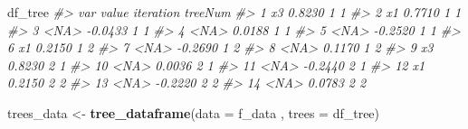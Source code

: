 \documentclass[
]{article}
\newenvironment{Shaded}{\begin{snugshade}}{\end{snugshade}}
\newcommand{\AttributeTok}[1]{\textcolor[rgb]{0.13,0.29,0.53}{#1}}
\newcommand{\CommentTok}[1]{\textcolor[rgb]{0.56,0.35,0.01}{\textit{#1}}}
\newcommand{\FunctionTok}[1]{\textcolor[rgb]{0.13,0.29,0.53}{\textbf{#1}}}
\newcommand{\NormalTok}[1]{#1}
\newcommand{\OtherTok}[1]{\textcolor[rgb]{0.56,0.35,0.01}{#1}}
\begin{document}
\begin{Shaded}
\begin{Highlighting}[]
\NormalTok{df\_tree}
\CommentTok{\#\textgreater{}     var   value iteration treeNum}
\CommentTok{\#\textgreater{} 1    x3  0.8230         1       1}
\CommentTok{\#\textgreater{} 2    x1  0.7710         1       1}
\CommentTok{\#\textgreater{} 3  \textless{}NA\textgreater{} {-}0.0433         1       1}
\CommentTok{\#\textgreater{} 4  \textless{}NA\textgreater{}  0.0188         1       1}
\CommentTok{\#\textgreater{} 5  \textless{}NA\textgreater{} {-}0.2520         1       1}
\CommentTok{\#\textgreater{} 6    x1  0.2150         1       2}
\CommentTok{\#\textgreater{} 7  \textless{}NA\textgreater{} {-}0.2690         1       2}
\CommentTok{\#\textgreater{} 8  \textless{}NA\textgreater{}  0.1170         1       2}
\CommentTok{\#\textgreater{} 9    x3  0.8230         2       1}
\CommentTok{\#\textgreater{} 10 \textless{}NA\textgreater{}  0.0036         2       1}
\CommentTok{\#\textgreater{} 11 \textless{}NA\textgreater{} {-}0.2440         2       1}
\CommentTok{\#\textgreater{} 12   x1  0.2150         2       2}
\CommentTok{\#\textgreater{} 13 \textless{}NA\textgreater{} {-}0.2220         2       2}
\CommentTok{\#\textgreater{} 14 \textless{}NA\textgreater{}  0.0783         2       2}
\end{Highlighting}
\end{Shaded}

\begin{Shaded}
\begin{Highlighting}[]
\NormalTok{trees\_data }\OtherTok{\textless{}{-}} \FunctionTok{tree\_dataframe}\NormalTok{(}\AttributeTok{data =}\NormalTok{ f\_data , }\AttributeTok{trees =}\NormalTok{ df\_tree)}
\end{Highlighting}
\end{Shaded}
\end{document}
